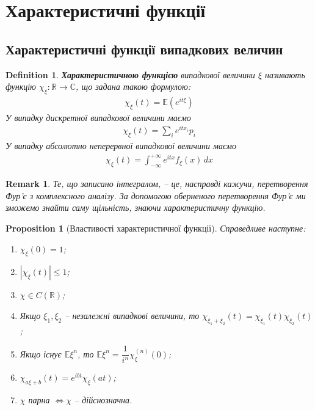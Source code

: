 \documentclass[a4paper, 10pt]{article}
\theoremstyle{theoremdd}
\newtheorem{definition}[theorem]{Definition}
\newtheorem{proposition}[theorem]{Proposition}
\newtheorem{remark}[theorem]{Remark}
\begin{document}
\section{Характеристичні функції}
\subsection{Характеристичні функції випадкових величин}
\begin{definition}
\textbf{Характеристичною функцією} випадкової величини $\xi$ називають функцію $\chi_\xi \colon \mathbb{R} \to \mathbb{C}$, що задана такою формулою:
\begin{align*}
\chi_\xi(t) = \mathbb{E} (e^{i t \xi})
\end{align*}
У випадку дискретної випадкової величини маємо
\begin{align*}
\chi_\xi(t) = \sum_i e^{i t x_i} p_i
\end{align*}
У випадку абсолютно неперервної випадкової величини маємо
\begin{align*}
\chi_\xi(t) = \int_{-\infty}^{+\infty} e^{itx} f_\xi(x)\,dx
\end{align*}
\end{definition}

\begin{remark}
Те, що записано інтегралом, -- це, насправді кажучи, перетворення Фур'є з комплексного аналізу. За допомогою оберненого перетворення Фур'є ми зможемо знайти саму щільність, знаючи характеристичну функцію.
\end{remark}

\begin{proposition}[Властивості характеристичної функції]
Справедливе наступне:
\begin{enumerate}[nosep,wide=0pt,label={\arabic*)}]
\iffalse \item Характеристична функція -- унікальна характеристика йомвірнісного розподілу; \fi
\item $\chi_\xi(0) = 1$;
\item $|\chi_\xi(t)| \leq 1$;
\item $\chi \in C(\mathbb{R})$;
\item Якщо $\xi_1,\xi_2$ -- незалежні випадкові величини, то $\chi_{\xi_1+\xi_2}(t) = \chi_{\xi_1}(t) \chi_{\xi_2}(t)$;
\item Якщо існує $\mathbb{E}\xi^n$, то $\mathbb{E}\xi^n = \dfrac{1}{i^n} \chi^{(n)}_\xi(0)$;
\item $\chi_{a\xi + b}(t) = e^{ibt}\chi_\xi(at)$;
\item $\chi$ парна $\iff \chi$ -- дійснозначна.
\end{enumerate}
\end{proposition}
\end{document}
